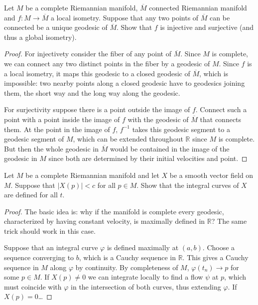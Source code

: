 \begin{exercise}
\label{exercise-local-isometry-hopf-rinow}
\begin{reference}
\cite[Exercise 8, Chapter VIII]{doc}
\end{reference}
Let $M$ be a complete Riemannian manifold,
$\overline{M}$ connected Riemannian manifold
and $f:M \to \overline{M}$ a local isometry.
Suppose that any two points of $\overline{M}$
can be connected be a unique geodesic
of $\overline{M}$.
Show that $f$ is injective and surjective
(and thus a global isometry).
\end{exercise}

\begin{proof}
For injectivety consider the fiber of
any point of $\overline{M}$. Since $M$
is complete, we can connect any two distinct
points in the fiber by a geodesic of $M$.
Since $f$ is a local isometry, it maps
this geodesic to a closed geodesic of
$\overline{M}$, which is impossible:
two nearby points along a closed geodesic
have to geodesics joining them, the short
way and the long way along the geodesic.

For surjectivity suppose there is a point
outside the image of $f$. Connect such a
point with a point inside the image of $f$
with the geodesic of $\overline{M}$
that connects them. At the point in the image
of $f$,  $f^{-1}$ takes this geodesic segment
to a geodesic segment of $M$,
which can be extended
throughout $\mathbb{R}$ since $M$ is
complete. But then the whole geodesic in
$\overline{M}$ would be contained in the
image of the geodesic in $M$ since both
are determined by their initial velocities
and point.
\end{proof}

\begin{exercise}
\label{exercise-bounded-flow-speed}
\begin{reference}
\cite[Exercise 11, Chapter VII]{doc}
\end{reference}
Let $M$ be a complete Riemannian manifold
and let $X$ be a smooth vector field on $M$.
Suppose that $|X(p)|<c$ for all $p \in M$.
Show that the integral curves of $X$
are defined for all $t$.
\end{exercise}

\begin{proof}
The basic idea is:
why if the manifold is complete
every geodesic,
characterized by having constant
velocity,
is maximally defined in $\mathbb{R}$?
The same trick should work in this case.

Suppose that an integral curve $\varphi$
is defined maximally at $(a,b)$.
Choose a sequence converging to $b$,
which is a Cauchy sequence in $\mathbb{R}$.
This gives a Cauchy sequence in $M$
along $\varphi$ by continuity.
By completeness of $M$, $\varphi(t_n) \to p$
for some $p \in M$.
If $X(p) \neq 0$ we can integrate locally
to find a flow $\psi$ at $p$,
which must coincide with $\varphi$ in
the intersection of both curves,
thus extending $\varphi$.
If $X(p)=0$…
\end{proof}

